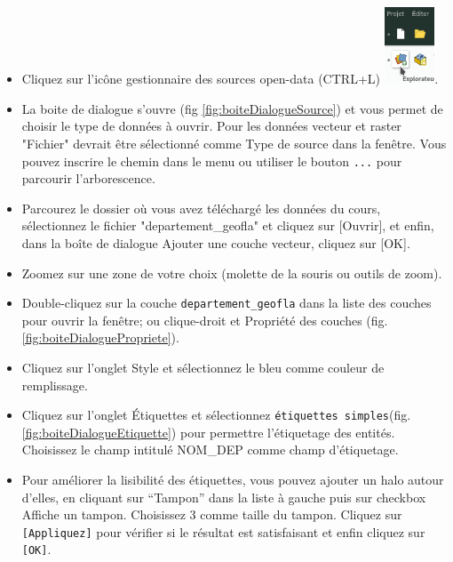 \documentclass[a4paper, 11pt]{article}
\begin{document}
  \begin{itemize}
    \item Cliquez sur l’icône gestionnaire des sources open-data (CTRL+L) \includegraphics[width=1.5cm]{img/qgis_gestionnaire_de_sources}.
    \item La boite de dialogue s'ouvre (fig \ref{fig:boiteDialogueSource}) et vous permet de choisir le type de données à ouvrir. Pour les données vecteur et raster  "Fichier" devrait être sélectionné comme Type de source dans la fenêtre. Vous pouvez inscrire le chemin dans le menu ou utiliser le bouton \texttt{...} pour parcourir l'arborescence.
    \item Parcourez le dossier où vous avez téléchargé les données du cours, sélectionnez le fichier "departement\_geofla" et cliquez sur [Ouvrir], et enfin, dans la boîte de dialogue Ajouter une couche vecteur, cliquez sur [OK].
    \item Zoomez sur une zone de votre choix (molette de la souris ou outils de zoom).
    \item Double-cliquez sur la couche \texttt{departement\_geofla} dans la liste des couches pour ouvrir la fenêtre; ou clique-droit et Propriété des couches (fig. \ref{fig:boiteDialoguePropriete}).
    \item Cliquez sur l’onglet Style et sélectionnez le bleu comme couleur de remplissage.
    \item Cliquez sur l’onglet Étiquettes et sélectionnez \texttt{étiquettes simples}(fig. \ref{fig:boiteDialogueEtiquette}) pour permettre l’étiquetage des entités. Choisissez le champ intitulé NOM\_DEP comme champ d’étiquetage.
    \item Pour améliorer la lisibilité des étiquettes, vous pouvez ajouter un halo autour d’elles, en cliquant sur “Tampon” dans la liste à gauche puis sur checkbox Affiche un tampon. Choisissez 3 comme taille du tampon.
    Cliquez sur \texttt{[Appliquez]} pour vérifier si le résultat est satisfaisant et enfin cliquez sur \texttt{[OK]}.
  \end{itemize}
\end{document}

